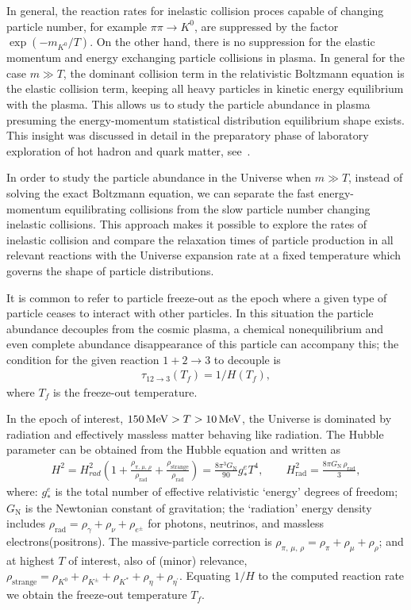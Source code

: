 In general, the reaction rates for inelastic collision proces  capable of changing particle number, for example $\pi\pi\to K^0$, are suppressed by the factor $\exp{(-m_{K^0}/T)}$. On the other hand, there is no suppression for the elastic momentum and energy exchanging particle collisions in plasma. In general for the case $m\gg T$, the dominant collision term in the relativistic Boltzmann equation is the elastic collision term, keeping all heavy particles in kinetic energy equilibrium with the plasma. This allows us to study the particle abundance in plasma presuming the energy-momentum statistical distribution equilibrium shape exists. This insight was discussed in detail in the preparatory phase of laboratory exploration of hot hadron and quark matter, see~\cite{Koch:1986ud}. 

In order to study the particle abundance in the Universe when $m\gg T$, instead of solving the exact Boltzmann equation, we can separate the fast energy-momentum equilibrating collisions from the slow particle number changing inelastic collisions. This approach makes it possible to explore the rates of inelastic collision and compare the relaxation times of particle production in all relevant reactions with the Universe expansion rate at a fixed temperature which governs the shape of particle distributions.

It is common to refer to particle freeze-out as the epoch where a given type of particle ceases to interact with other particles. In this situation the particle abundance decouples from the cosmic plasma, a chemical nonequilibrium and even complete abundance disappearance of this particle can accompany this; the condition for the given reaction $1+2\rightarrow 3$ to decouple is
\begin{align}
\tau_{12\rightarrow 3}(T_f)=1/H(T_f),
\end{align}
where $T_f$ is the freeze-out temperature.

In the epoch of interest, $150\text{\,MeV}>T>10\text{\,MeV}$, the Universe is dominated by radiation and effectively massless matter behaving like radiation. The Hubble parameter can be obtained from the Hubble equation
 and written as~\cite{Kolb:1990vq}
\begin{align}\label{H2g}
H^2=H^2_{rad}\left(1+\frac{\rho_{\pi,\,\mu,\,\rho}}{\rho_\mathrm{rad}}+\frac{\rho_\mathrm{strange}}{\rho_\mathrm{rad}}\right)=\frac{8\pi^3G_\mathrm{N}}{90}g^e_\ast T^4,\qquad H^2_\mathrm{rad}=\frac{8\pi G_\mathrm{N}\,\rho_\mathrm{rad}}{3},
\end{align}
where: $g^e_\ast$ is the total number of effective relativistic `energy' degrees of freedom; $G_\mathrm{N}$ is the Newtonian constant of gravitation; the `radiation' energy density includes $\rho_\mathrm{rad}=\rho_\gamma+\rho_\nu+\rho_{e^\pm}$ for photons, neutrinos, and massless electrons(positrons). The massive-particle correction is $\rho_{\pi,\,\mu,\,\rho}=\rho_\pi+\rho_\mu+\rho_\rho$; and at highest $T$ of interest, also of (minor) relevance, $\rho_\mathrm{strange}=\rho_{K^0}+\rho_{K^\pm}+\rho_{K^\ast}+\rho_{\eta}+\rho_{\eta^\prime}$.
Equating $1/H$ to the computed reaction rate we obtain the freeze-out temperature $T_f$. 

